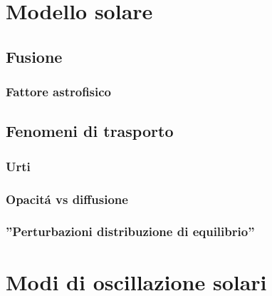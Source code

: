 \documentclass[../main.tex]{subfiles}
\begin{document}
\chapter{Modello solare}
\cite{alfvenwaves}

\begin{refsection}
\nocite{*}
\begingroup
\let\clearpage\relax
\printbibliography
\endgroup

\section{Fusione}

\subsection{Fattore astrofisico}

\section{Fenomeni di trasporto}


\subsection{Urti}

\subsection{Opacit\'a vs diffusione}

\subsection{''Perturbazioni distribuzione di equilibrio''}

\end{refsection}

\chapter{Modi di oscillazione solari}
\end{document}
